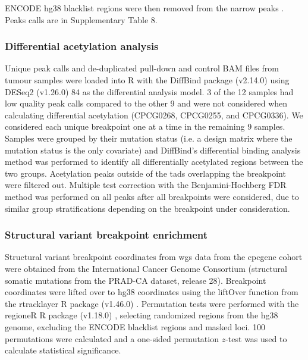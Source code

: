 ENCODE hg38 blacklist regions were then removed from the narrow peaks \cite{amemiyaENCODEBlacklistIdentification2019}.
Peaks calls are in Supplementary Table 8.

\subsubsection{Differential acetylation analysis}

Unique peak calls and de-duplicated pull-down and control BAM files from tumour samples were loaded into R with the DiffBind package (v2.14.0) \cite{starkDiffBindDifferentialBinding2011} using DESeq2 (v1.26.0) 84 as the differential analysis model.
3 of the 12 samples had low quality peak calls compared to the other 9 and were not considered when calculating differential acetylation (CPCG0268, CPCG0255, and CPCG0336).
We considered each unique breakpoint one at a time in the remaining 9 samples.
Samples were grouped by their mutation status (i.e. a design matrix where the mutation status is the only covariate) and DiffBind's differential binding analysis method was performed to identify all differentially acetylated regions between the two groups.
Acetylation peaks outside of the \glspl{tad} overlapping the breakpoint were filtered out.
Multiple test correction with the Benjamini-Hochberg FDR method \cite{benjaminiControllingFalseDiscovery1995} was performed on all peaks after all breakpoints were considered, due to similar group stratifications depending on the breakpoint under consideration.

\subsubsection{Structural variant breakpoint enrichment}

Structural variant breakpoint coordinates from \gls{wgs} data from the \gls{cpcgene} cohort were obtained from the International Cancer Genome Consortium (structural somatic mutations from the PRAD-CA dataset, release 28).
Breakpoint coordinates were lifted over to hg38 coordinates using the liftOver function from the rtracklayer R package (v1.46.0) \cite{lawrenceRtracklayerPackageInterfacing2009}.
Permutation tests were performed with the regioneR R package (v1.18.0) \cite{gelRegioneRBioconductorPackage2015}, selecting randomized regions from the hg38 genome, excluding the ENCODE blacklist regions \cite{amemiyaENCODEBlacklistIdentification2019} and masked loci.
100 permutations were calculated and a one-sided permutation $z$-test was used to calculate statistical significance.

